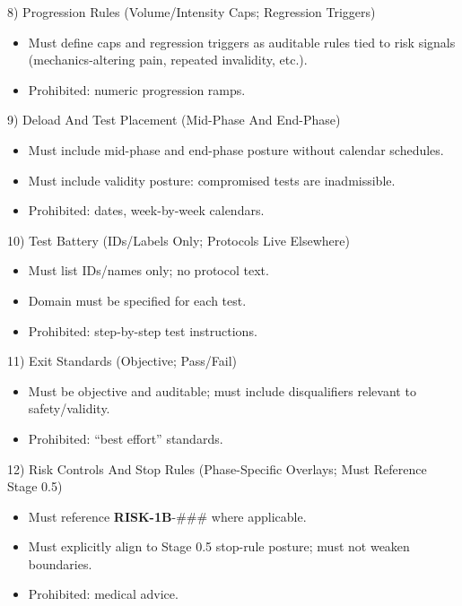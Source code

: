 \documentclass[10pt]{article}
\begin{document}
8) Progression Rules (Volume/Intensity Caps; Regression Triggers)

\begin{itemize}
\item Must define caps and regression triggers as auditable rules tied to risk signals (mechanics-altering pain, repeated invalidity, etc.).
\item Prohibited: numeric progression ramps.
\end{itemize}

9) Deload And Test Placement (Mid-Phase And End-Phase)

\begin{itemize}
\item Must include mid-phase and end-phase posture without calendar schedules.
\item Must include validity posture: compromised tests are inadmissible.
\item Prohibited: dates, week-by-week calendars.
\end{itemize}

10) Test Battery (IDs/Labels Only; Protocols Live Elsewhere)

\begin{itemize}
\item Must list IDs/names only; no protocol text.
\item Domain must be specified for each test.
\item Prohibited: step-by-step test instructions.
\end{itemize}

11) Exit Standards (Objective; Pass/Fail)

\begin{itemize}
\item Must be objective and auditable; must include disqualifiers relevant to safety/validity.
\item Prohibited: “best effort” standards.
\end{itemize}

12) Risk Controls And Stop Rules (Phase-Specific Overlays; Must Reference Stage 0.5)

\begin{itemize}
\item Must reference \textbf{RISK-1B}-\#\#\# where applicable.
\item Must explicitly align to Stage 0.5 stop-rule posture; must not weaken boundaries.
\item Prohibited: medical advice.
\end{itemize}
\end{document}
